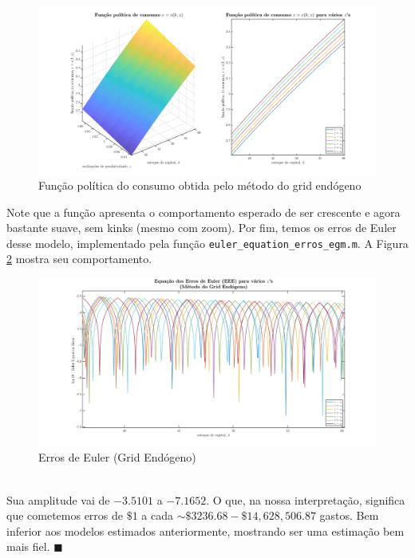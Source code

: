 \documentclass[10pt]{article}
\newcommand*{\QEDA}{\hfill\ensuremath{\blacksquare}}%
\newcommand\0{\mathbf{0}}
\newenvironment{sol}
    {\\[1em] {\color{magenta}\text{Resposta.}}
    }
    {{\color{blue!50!black}\QEDA}}
\begin{document}
\begin{enumerate}[wide]
\begin{sol}
\begin{figure}[htp!]
\centering
\includegraphics[scale=0.30]{consumption_policy_function_egm.png}
\caption{Função política do consumo obtida pelo método do grid endógeno}
\label{fig12}
\end{figure}
Note que a função apresenta o comportamento esperado de ser crescente e agora bastante suave, sem kinks (mesmo com zoom). Por fim, temos os erros de Euler desse modelo, implementado pela função \texttt{euler\_equation\_erros\_egm.m}. A Figura \ref{fig13} mostra seu comportamento.
\begin{figure}[htp!]
\centering
\includegraphics[scale=0.3]{eee_egm.png}
\caption{Erros de Euler (Grid Endógeno)}
\label{fig13}
\end{figure}\\
Sua amplitude vai de $-3.5101$ a $-7.1652$. O que, na nossa interpretação, significa que cometemos erros de $\$1$ a cada $\sim \$3236.68 - \$ 14,628,506.87$ gastos. Bem inferior aos modelos estimados anteriormente, mostrando ser uma estimação bem mais fiel.
\end{sol}

\end{enumerate}
\end{document}
